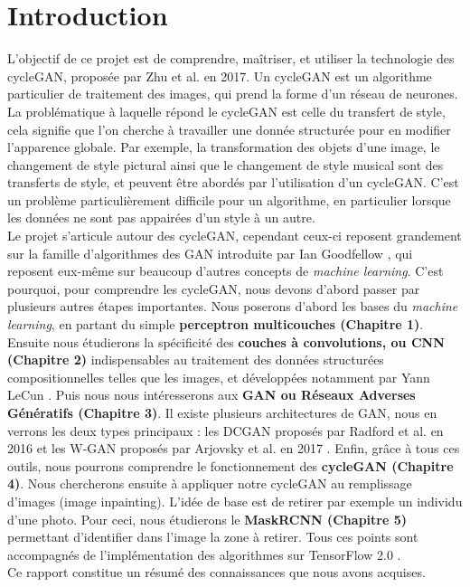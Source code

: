\chapter*{Introduction}


L'objectif de ce projet est de comprendre, maîtriser, et utiliser la technologie des cycleGAN, proposée par Zhu et al. \cite{zhu_unpaired_2018} en 2017. Un cycleGAN est un algorithme particulier de traitement des images, qui prend la forme d'un réseau de neurones. La problématique à laquelle répond le cycleGAN est celle du transfert de style, cela signifie que l'on cherche à travailler une donnée structurée pour en modifier l’apparence globale. Par exemple, la transformation des objets d'une image, le changement de style pictural ainsi que le changement de style musical sont des transferts de style, et peuvent être abordés par l'utilisation d'un cycleGAN. C'est un problème particulièrement difficile pour un algorithme, en particulier lorsque les données ne sont pas appairées d'un style à un autre.\\

Le projet s'articule autour des cycleGAN, cependant ceux-ci reposent grandement sur la famille d'algorithmes des GAN introduite par Ian Goodfellow \cite{goodfellow_generative_2014-1}, qui reposent eux-même sur beaucoup d'autres concepts de \textit{machine learning}. C'est pourquoi, pour comprendre les cycleGAN, nous devons d'abord passer par plusieurs autres étapes importantes. Nous poserons d'abord les bases du \textit{machine learning}, en partant du simple \textbf{perceptron multicouches (Chapitre 1)}. Ensuite nous étudierons la spécificité des \textbf{couches à convolutions, ou 
CNN (Chapitre 2)} indispensables au traitement des données structurées compositionnelles telles que les images, et développées notamment par Yann LeCun \cite{lecun_gradient-based_1998}. Puis nous nous intéresserons aux \textbf{GAN ou Réseaux Adverses Génératifs (Chapitre 3)}. Il existe plusieurs architectures de GAN, nous en verrons les deux types principaux : les DCGAN proposés par Radford et al. en 2016 \cite{radford_unsupervised_2016} et les W-GAN proposés par Arjovsky et al. en 2017 \cite{arjovsky_wasserstein_2017}. Enfin, grâce à tous ces outils, nous pourrons comprendre le fonctionnement des \textbf{cycleGAN (Chapitre 4)}. Nous chercherons ensuite à appliquer notre cycleGAN au remplissage d'images (image inpainting). L'idée de base est de retirer par exemple un individu d'une photo. Pour ceci, nous étudierons le \textbf{MaskRCNN (Chapitre 5)} permettant d'identifier dans l'image la zone à retirer. Tous ces points sont accompagnés de l'implémentation des algorithmes sur TensorFlow 2.0 \cite{goldsborough_tour_2016}.\\

Ce rapport constitue un résumé des connaissances que nous avons acquises.
